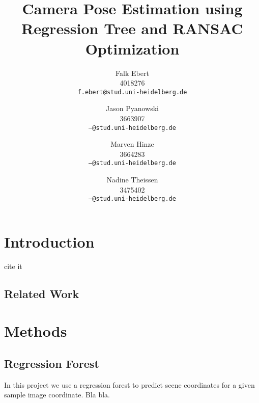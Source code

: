 \documentclass[final]{cvpr}
\begin{document}
\title{Camera Pose Estimation using Regression Tree and RANSAC Optimization}

\author{Falk Ebert\\
4018276\\
{\tt\small f.ebert@stud.uni-heidelberg.de}
\and
Jason Pyanowski\\
3663907\\
{\tt\small ---@stud.uni-heidelberg.de}
\and
Marven Hinze\\
3664283\\
{\tt\small ---@stud.uni-heidelberg.de}
\and
Nadine Theissen\\
3475402\\
{\tt\small ---@stud.uni-heidelberg.de}
}

\maketitle


\begin{abstract}
   
\end{abstract}

\section{Introduction}
cite it~\cite{shotton2013}

\subsection{Related Work}


\section{Methods}
\subsection{Regression Forest}

In this project we use a regression forest to predict scene coordinates for a given
sample image coordinate. Bla bla.
\end{document}
